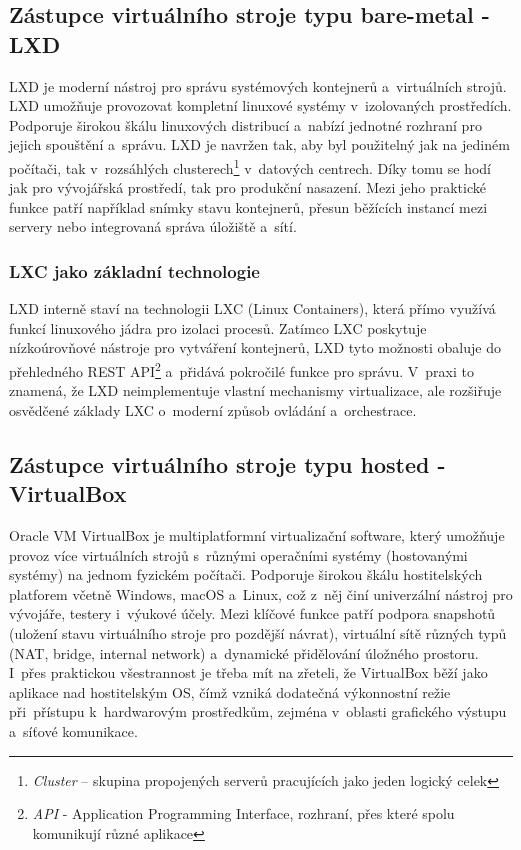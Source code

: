 \subsection{Zástupce virtuálního stroje typu bare-metal - LXD}
LXD je moderní nástroj pro správu systémových kontejnerů a~virtuálních strojů. 
LXD umožňuje provozovat kompletní linuxové systémy v~izolovaných prostředích. 
Podporuje širokou škálu linuxových distribucí a~nabízí jednotné rozhraní pro jejich spouštění a~správu. 
LXD je navržen tak, aby byl použitelný jak na jediném počítači, tak v~rozsáhlých clusterech\footnote{\textit{Cluster} – skupina propojených serverů pracujících jako jeden logický celek} v~datových centrech. 
Díky tomu se hodí jak pro vývojářská prostředí, tak pro produkční nasazení. 
Mezi jeho praktické funkce patří například snímky stavu kontejnerů, přesun běžících instancí mezi servery nebo integrovaná správa úložiště a~sítí. 
\cite{lxddocs}

\subsubsection{LXC jako základní technologie}

LXD interně staví na technologii LXC (Linux Containers), která přímo využívá funkcí linuxového jádra pro izolaci procesů. 
Zatímco LXC poskytuje nízkoúrovňové nástroje pro vytváření kontejnerů, LXD tyto možnosti obaluje do přehledného REST API\footnote{\textit{API} - Application Programming Interface, rozhraní, přes které spolu komunikují různé aplikace} a~přidává pokročilé funkce pro správu. 
V~praxi to znamená, že LXD neimplementuje vlastní mechanismy virtualizace, ale rozšiřuje osvědčené základy LXC o~moderní způsob ovládání a~orchestrace. \cite{lxcintro}

\subsection{Zástupce virtuálního stroje typu hosted - VirtualBox}
Oracle VM VirtualBox je multiplatformní virtualizační software, který umožňuje provoz více virtuálních strojů s~různými operačními systémy (hostovanými systémy) na jednom fyzickém počítači. 
Podporuje širokou škálu hostitelských platforem včetně Windows, macOS a~Linux, což z~něj činí univerzální nástroj pro vývojáře, testery i~výukové účely. 
Mezi klíčové funkce patří podpora snapshotů (uložení stavu virtuálního stroje pro pozdější návrat), virtuální sítě různých typů (NAT, bridge, internal network) a~dynamické přidělování úložného prostoru. 
I~přes praktickou všestrannost je třeba mít na zřeteli, že VirtualBox běží jako aplikace nad hostitelským OS, čímž vzniká dodatečná výkonnostní režie při~přístupu k~hardwarovým prostředkům, zejména v~oblasti grafického výstupu a~síťové komunikace. \cite{virtualboxdocs}

